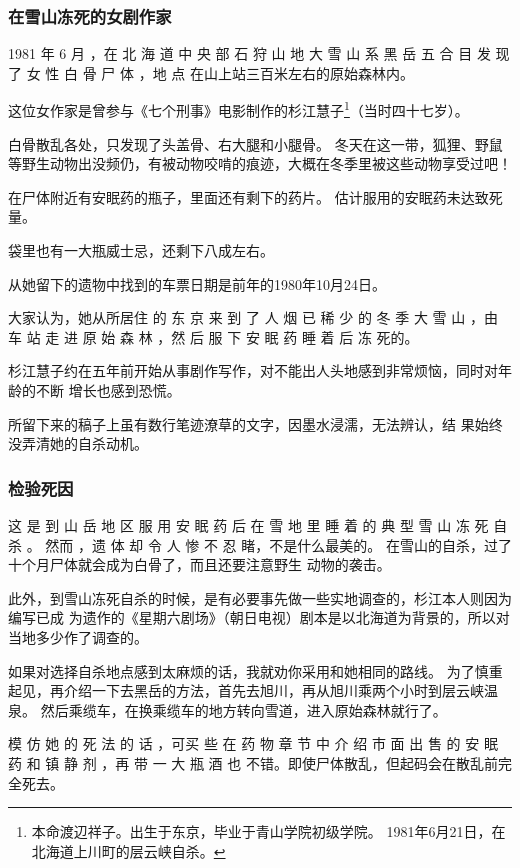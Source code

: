 \documentclass[UTF8]{ctexart}
\begin{document}
\subsubsection*{在雪山冻死的女剧作家}

1981 年 6 月 ，在 北 海 道 中 央 部 石 狩 山 地 大 雪 山 系 黑 岳 五 合 目 发 现 了 女 性 白 骨 尸 体 ，地 点 在山上站三百米左右的原始森林内。

这位女作家是曾参与《七个刑事》电影制作的杉江慧子\footnote{本命渡辺祥子。出生于东京，毕业于青山学院初级学院。 1981年6月21日，在北海道上川町的层云峡自杀。}（当时四十七岁）。

白骨散乱各处，只发现了头盖骨、右大腿和小腿骨。
冬天在这一带，狐狸、野鼠等野生动物出没频仍，有被动物咬啃的痕迹，大概在冬季里被这些动物享受过吧！

在尸体附近有安眠药的瓶子，里面还有剩下的药片。
估计服用的安眠药未达致死量。

袋里也有一大瓶威士忌，还剩下八成左右。

从她留下的遗物中找到的车票日期是前年的1980年10月24日。

大家认为，她从所居住 的 东 京 来 到 了 人 烟 已 稀 少 的 冬 季 大 雪 山 ，由 车 站 走 进 原 始 森 林 ，然 后 服 下 安 眠 药 睡 着 后 冻 死的。

杉江慧子约在五年前开始从事剧作写作，对不能出人头地感到非常烦恼，同时对年龄的不断 增长也感到恐慌。

所留下来的稿子上虽有数行笔迹潦草的文字，因墨水浸濡，无法辨认，结 果始终没弄清她的自杀动机。

\subsubsection*{检验死因}

这 是 到 山 岳 地 区 服 用 安 眠 药 后 在 雪 地 里 睡 着 的 典 型 雪 山 冻 死 自 杀 。
然而 ，遗 体 却 令 人 惨 不 忍 睹，不是什么最美的。
在雪山的自杀，过了十个月尸体就会成为白骨了，而且还要注意野生 动物的袭击。

此外，到雪山冻死自杀的时候，是有必要事先做一些实地调查的，杉江本人则因为编写已成 为遗作的《星期六剧场》（朝日电视）剧本是以北海道为背景的，所以对当地多少作了调查的。

如果对选择自杀地点感到太麻烦的话，我就劝你采用和她相同的路线。
为了慎重起见，再介绍一下去黑岳的方法，首先去旭川，再从旭川乘两个小时到层云峡温泉。
然后乘缆车，在换乘缆车的地方转向雪道，进入原始森林就行了。

模 仿 她 的 死 法 的 话 ，可买 些 在 药 物 章 节 中 介 绍 市 面 出 售 的 安 眠 药 和 镇 静 剂 ，再 带 一 大 瓶 酒 也 不错。即使尸体散乱，但起码会在散乱前完全死去。
\end{document}
